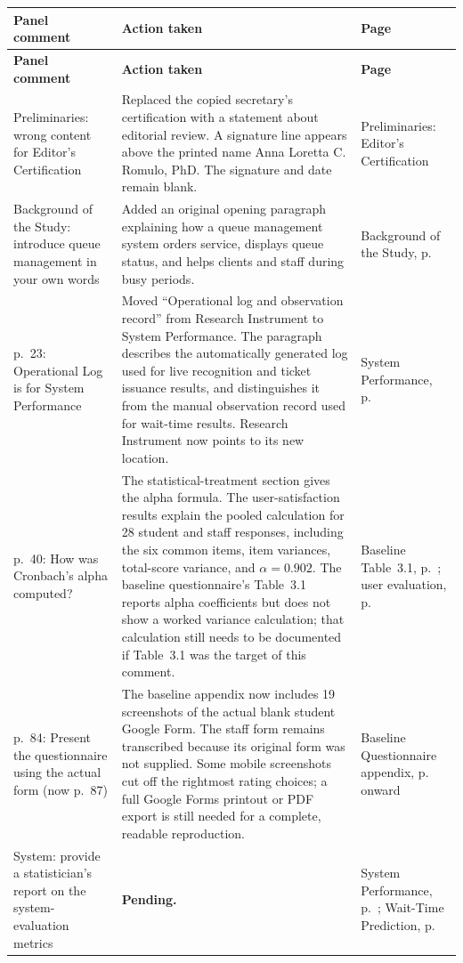 \documentclass[11pt,letterpaper]{article}
\begin{document}
\smallskip
\small
\begin{longtable}{|L{3.55cm}|L{8.15cm}|L{3.0cm}|}
\hline
\textbf{Panel comment} & \textbf{Action taken} &
\textbf{Page} \\ \hline
\endfirsthead
\hline
\textbf{Panel comment} & \textbf{Action taken} &
\textbf{Page} \\ \hline
\endhead

Preliminaries: wrong content for Editor's Certification
& \textbf{} Replaced the copied secretary's
certification with a statement about editorial review. A signature line
appears above the printed name Anna Loretta C. Romulo, PhD. The signature
and date remain blank.
& Preliminaries: Editor's Certification \\ \hline

Background of the Study: introduce queue management in your own words
& \textbf{} Added an original opening paragraph explaining
how a queue management system orders service, displays queue status,
and helps clients and staff during busy periods.
& Background of the Study, p.~\pageref{cr:background} \\ \hline

p.~23: Operational Log is for System Performance
& \textbf{} Moved ``Operational log and observation record''
from Research Instrument to System Performance. The paragraph describes
the automatically generated log used for live recognition and ticket
issuance results, and distinguishes it from the manual observation record
used for wait-time results. Research Instrument now points to its new
location.
& System Performance, p.~\pageref{sec:sop2-results} \\ \hline

p.~40: How was Cronbach's alpha computed?
& \textbf{} The statistical-treatment section gives
the alpha formula. The user-satisfaction results explain the pooled
calculation for 28 student and staff responses, including the six
common items, item variances, total-score variance, and
$\alpha=0.902$. The baseline questionnaire's Table~3.1 reports alpha
coefficients but does not show a worked variance calculation; that
calculation still needs to be documented if Table~3.1 was the target
of this comment.
& Baseline Table~3.1, p.~\pageref{tab:sop1-reliability}; user evaluation,
p.~\pageref{tab:sop4-reliability} \\ \hline

p.~84: Present the questionnaire using the actual form (now p.~87)
& \textbf{} The baseline appendix now includes 19
screenshots of the actual blank student Google Form. The staff form
remains transcribed because its original form was not supplied. Some
mobile screenshots cut off the rightmost rating choices; a full
Google Forms printout or PDF export is still needed for a complete,
readable reproduction.
& Baseline Questionnaire appendix, p.~\pageref{app:sop1-questionnaire}
onward \\ \hline

System: provide a statistician's report on the system-evaluation metrics
& \textbf{Pending.}
& System Performance, p.~\pageref{sec:sop2-results}; Wait-Time Prediction,
p.~\pageref{sec:sop3-results} \\ \hline

\end{longtable}
\end{document}
